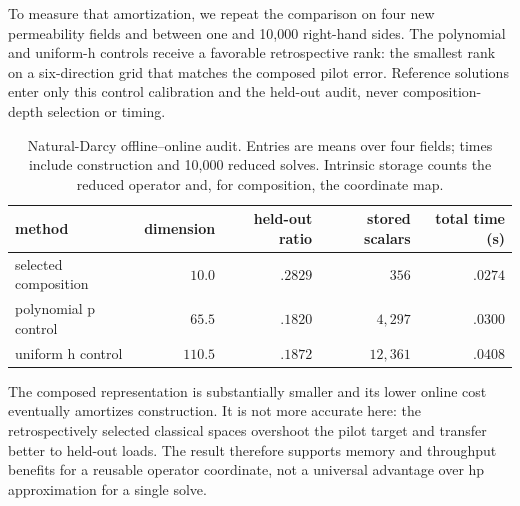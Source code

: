 \documentclass[11pt]{article}
\numberwithin{algorithm}{section}
\theoremstyle{definition}\newtheorem{definition}[theorem]{Definition}
\theoremstyle{remark}\newtheorem{remark}[theorem]{Remark}
\begin{document}
To measure that amortization, we repeat the comparison on four new
permeability fields and between one and 10,000 right-hand sides.  The
polynomial and uniform-h controls receive a favorable retrospective rank: the
smallest rank on a six-direction grid that matches the composed pilot error.
Reference solutions enter only this control calibration and the held-out
audit, never composition-depth selection or timing.
\begin{table}[H]
\centering
\caption{Natural-Darcy offline--online audit.  Entries are means over four
fields; times include construction and 10,000 reduced solves.  Intrinsic
storage counts the reduced operator and, for composition, the coordinate map.}
\begin{tabular}{lrrrr}
\toprule
method & dimension & held-out ratio & stored scalars & total time (s)\\
\midrule
selected composition & $10.0$ & $.2829$ & $356$ & $.0274$\\
polynomial p control & $65.5$ & $.1820$ & $4,297$ & $.0300$\\
uniform h control & $110.5$ & $.1872$ & $12,361$ & $.0408$\\
\bottomrule
\end{tabular}
\end{table}
The composed representation is substantially smaller and its lower online
cost eventually amortizes construction.  It is not more accurate here: the
retrospectively selected classical spaces overshoot the pilot target and
transfer better to held-out loads.  The result therefore supports memory and
throughput benefits for a reusable operator coordinate, not a universal
advantage over hp approximation for a single solve.
\end{document}

